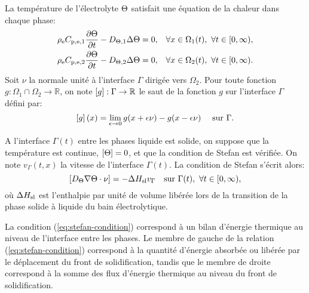 La température de l'électrolyte $\Theta$ satisfait une équation
de la chaleur dans chaque phase:
\begin{align}
  &\rho_\mathrm{e}C_{\mathrm{p,e,1}} \frac{\partial
    \Theta}{\partial t} - D_{\Theta,\mathrm{1}} \Delta\Theta
  = 0, & \forall x \in \Omega_1(t),\ \forall t\in [0,\infty),\label{eq:heat-solid-phase}\\
    &\rho_\mathrm{e}C_{\mathrm{p,e,2}} \frac{\partial
    \Theta}{\partial t} - D_{\Theta,\mathrm{2}} \Delta\Theta
  = 0, & \forall x \in \Omega_2(t),\ \forall t\in [0,\infty).\label{eq:heat-liquid-phase}
\end{align}
Soit $\nu$ la normale unité à l'interface $\Gamma$ dirigée vers
$\Omega_2$. Pour toute fonction $g:\Omega_1\cap\Omega_2\to\mathbb R$,
on note $\left[ g \right]:\Gamma\to\mathbb R$ le saut de la fonction $g$ sur
l'interface $\Gamma$ défini par:
\begin{equation}
  \left[ g \right](x) = \lim_{\epsilon\to 0}g(x + \epsilon\nu) - g(x -
  \epsilon\nu) \quad \text{ sur } \Gamma.
\end{equation}

A l'interface $\Gamma(t)$ entre les phases liquide est solide, on
suppose que la température est continue, $\left[ \Theta \right] = 0$, et
que la condition de Stefan est vérifiée. On note $v_\Gamma(t, x)$ la
vitesse de l'interface $\Gamma(t)$. La condition de Stefan s'écrit
alors:
\begin{equation}
  \jump{\electrolytetdiff\nabla\temperature \cdot \nu} %
  = - \fusionenthalpy v_\Gamma\quad\text{sur }\Gamma(t),\ \forall t\in[0,\infty),
  \label{eq:stefan-condition}
\end{equation}
où $\Delta H_\mathrm{sl}$ est l'enthalpie par unité de volume
libérée lors de la transition de la phase solide à liquide du
bain électrolytique.

La condition (\ref{eq:stefan-condition}) correspond à un bilan
d'énergie thermique au niveau de l'interface entre les phases. Le
membre de gauche de la relation (\ref{eq:stefan-condition}) correspond
à la quantité d'énergie absorbée ou libérée par le déplacement du
front de solidification, tandis que le membre de droite correspond à
la somme des flux d'énergie thermique au niveau du front de
solidification.

